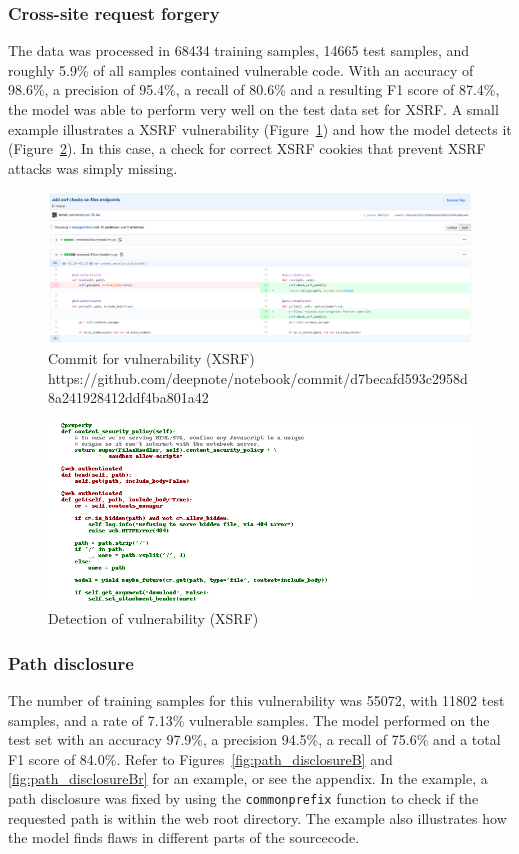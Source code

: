 \documentclass[
a4paper,
pagesize,
pdftex,
12pt,
twoside, %
BCOR=5mm, %
ngerman,
fleqn,
final,
]{scrartcl}
\begin{document}
	
	\subsubsection{Cross-site request forgery}
	The data was processed in 68434 training samples, 14665 test samples, and roughly 5.9\% of all samples contained vulnerable code. With an accuracy of 98.6\%, a precision of 95.4\%, a recall of 80.6\% and a resulting F1 score of 87.4\%, the model was able to perform very well on the test data set for XSRF. A small example illustrates a XSRF vulnerability (Figure~\ref{fig:xsrfA}) and how the model detects it (Figure~\ref{fig:xsrfAr}). In this case, a check for correct XSRF cookies that prevent XSRF attacks was simply missing.
	
	\begin{figure}[H]
		\centering
		\includegraphics[width=\linewidth]{Images/xsrfA}
		\caption{Commit for vulnerability (XSRF) \newline \scriptsize{https://github.com/deepnote/notebook/commit/d7becafd593c2958d8a241928412ddf4ba801a42
		}}
		\label{fig:xsrfA}
	\end{figure}
	\begin{figure}[H]
		\centering
		\includegraphics[width=\linewidth]{Images/xsrfAr}
		\caption{Detection of vulnerability (XSRF)}
		\label{fig:xsrfAr}
	\end{figure}

	\subsubsection{Path disclosure}
	The number of training samples for this vulnerability was 55072, with 11802 test samples, and a rate of 7.13\% vulnerable samples. The model performed on the test set with an accuracy 97.9\%, a precision 94.5\%, a recall of 75.6\% and a total F1 score of 84.0\%. Refer to Figures~\ref{fig:path_disclosureB} and \ref{fig:path_disclosureBr} for an example, or see the appendix. In the example, a path disclosure was fixed by using the \texttt{commonprefix} function to check if the requested path is within the web root directory. The example also illustrates how the model finds flaws in different parts of the sourcecode.
	
\end{document}
